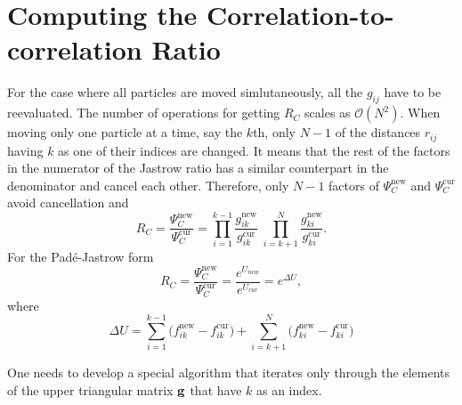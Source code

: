 \section{Computing the Correlation-to-correlation Ratio}\label{jastrowJastrowDer}
For the case where all particles are moved simlutaneously, all the $g_{ij}$ have to be reevaluated. The number of operations for getting $R_{C}$ scales as $\mathcal{O}(N^2)$. When moving only one particle at a time, say the $k$th, only $N-1$ of the distances $r_{ij}$ having $k$ as one of their indices are changed. It means that the rest of the factors in the numerator of the Jastrow ratio has a similar counterpart in the denominator and cancel each other. Therefore, only $N-1$ factors of $\Psi_{C}^\mathrm{new}$ and $\Psi_{C}^\mathrm{cur}$ avoid cancellation and 
\begin{equation}\label{RjfRatio}
 \boxed{R_{C} = \frac{\Psi_{C}^\mathrm{new}}{\Psi_{C}^\mathrm{cur}} =
\prod_{i=1}^{k-1}\frac{g_{ik}^\mathrm{new}}{g_{ik}^\mathrm{cur}}\;
\prod_{i=k+1}^{N}\frac{g_{ki}^\mathrm{new}}{g_{ki}^\mathrm{cur}}}.
\end{equation}\label{padepadeRatio}
For the Pad\'e-Jastrow form
\begin{equation}
 \boxed{R_{C} = \frac{\Psi_{C}^\mathrm{new}}{\Psi_{C}^\mathrm{cur}} = \frac{e^{U_{new}}}{e^{U_{cur}}} = e^{\Delta U},}
\end{equation}
where
\begin{equation}
\Delta U =
\sum_{i=1}^{k-1}\big(f_{ik}^\mathrm{new}-f_{ik}^\mathrm{cur}\big)
+
\sum_{i=k+1}^{N}\big(f_{ki}^\mathrm{new}-f_{ki}^\mathrm{cur}\big)
\end{equation}

One needs to develop a special algorithm 
that iterates only through the elements of the upper triangular
matrix ${\bf g}$ that have $k$ as an index. 

